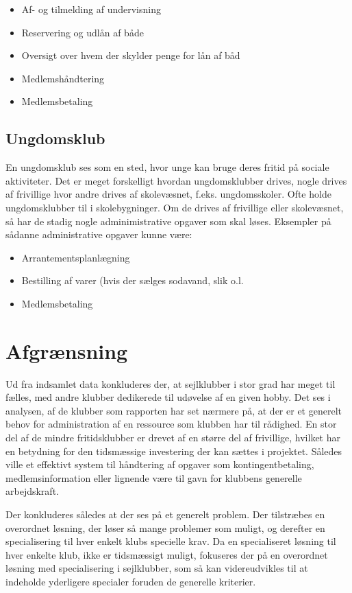 \begin{itemize}
\item Af- og tilmelding af undervisning
\item Reservering og udlån af både
\item Oversigt over hvem der skylder penge for lån af båd
\item Medlemshåndtering
\item Medlemsbetaling
\end{itemize}

\subsection{Ungdomsklub}
En ungdomsklub ses som en sted, hvor unge kan bruge deres fritid på sociale aktiviteter. Det er meget forskelligt hvordan ungdomsklubber drives, nogle drives af frivillige hvor andre drives af skolevæsnet, f.eks. ungdomsskoler. Ofte holde ungdomsklubber til i skolebygninger. Om de drives af frivillige eller skolevæsnet, så har de stadig nogle adminimistrative opgaver som skal løses. Eksempler på sådanne administrative opgaver kunne være:

\begin{itemize}
\item Arrantementsplanlægning
\item Bestilling af varer (hvis der sælges sodavand, slik o.l.
\item Medlemsbetaling
\end{itemize}

\section{Afgrænsning}



Ud fra indsamlet data konkluderes der, at sejlklubber i stor grad har meget til fælles, med andre klubber dedikerede til udøvelse af en given hobby. Det ses i analysen, af de klubber som rapporten har set nærmere på, at der er et generelt behov for administration af en ressource som klubben har til rådighed. En stor del af de mindre fritidsklubber er drevet af en større del af frivillige, hvilket har en betydning for den tidsmæssige investering der kan sættes i projektet. Således ville et effektivt system til håndtering af opgaver som kontingentbetaling, medlemsinformation eller lignende være til gavn for klubbens generelle arbejdskraft.

Der konkluderes således at der ses på et generelt problem. Der tilstræbes en overordnet løsning, der løser så mange problemer som muligt, og derefter en specialisering til hver enkelt klubs specielle krav. Da en specialiseret løsning til hver enkelte klub, ikke er tidsmæssigt muligt, fokuseres der på en overordnet løsning med specialisering i sejlklubber, som så kan videreudvikles til at indeholde yderligere specialer foruden de generelle kriterier.

